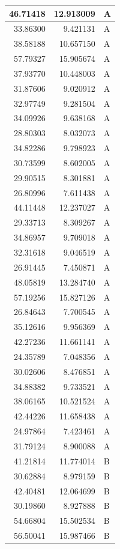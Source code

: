 \documentclass[
  letterpaper,
  DIV=11,
  numbers=noendperiod]{scrartcl}
\begin{document}
\begin{table}
\begin{tabular}[t]{r|r|l}
\hline
46.71418 & 12.913009 & A\\
\hline
33.86300 & 9.421131 & A\\
\hline
38.58188 & 10.657150 & A\\
\hline
57.79327 & 15.905674 & A\\
\hline
37.93770 & 10.448003 & A\\
\hline
31.87606 & 9.020912 & A\\
\hline
32.97749 & 9.281504 & A\\
\hline
34.09926 & 9.638168 & A\\
\hline
28.80303 & 8.032073 & A\\
\hline
34.82286 & 9.798923 & A\\
\hline
30.73599 & 8.602005 & A\\
\hline
29.90515 & 8.301881 & A\\
\hline
26.80996 & 7.611438 & A\\
\hline
44.11448 & 12.237027 & A\\
\hline
29.33713 & 8.309267 & A\\
\hline
34.86957 & 9.709018 & A\\
\hline
32.31618 & 9.046519 & A\\
\hline
26.91445 & 7.450871 & A\\
\hline
48.05819 & 13.284740 & A\\
\hline
57.19256 & 15.827126 & A\\
\hline
26.84643 & 7.700545 & A\\
\hline
35.12616 & 9.956369 & A\\
\hline
42.27236 & 11.661141 & A\\
\hline
24.35789 & 7.048356 & A\\
\hline
30.02606 & 8.476851 & A\\
\hline
34.88382 & 9.733521 & A\\
\hline
38.06165 & 10.521524 & A\\
\hline
42.44226 & 11.658438 & A\\
\hline
24.97864 & 7.423461 & A\\
\hline
31.79124 & 8.900088 & A\\
\hline
41.21814 & 11.774014 & B\\
\hline
30.62884 & 8.979159 & B\\
\hline
42.40481 & 12.064699 & B\\
\hline
30.19860 & 8.927888 & B\\
\hline
54.66804 & 15.502534 & B\\
\hline
56.50041 & 15.987466 & B\\

\end{tabular}
\end{table}
\end{document}
